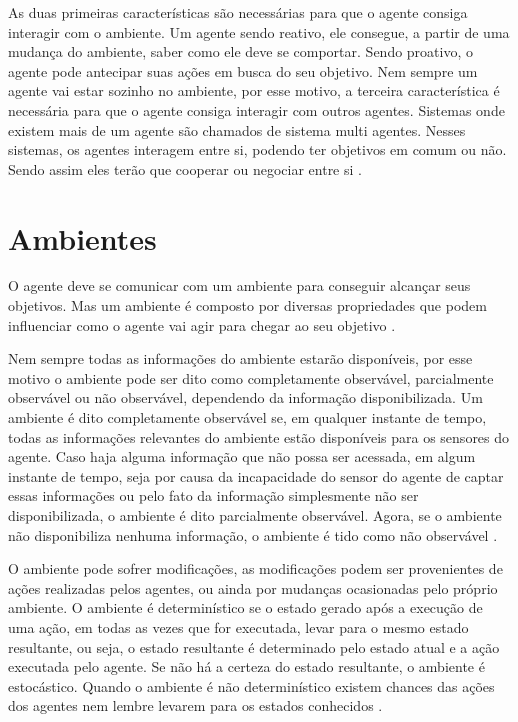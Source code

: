 As duas primeiras características são necessárias para que o agente consiga interagir com o ambiente. Um agente sendo reativo, ele consegue, a partir de uma mudança do ambiente, saber como ele deve se comportar. Sendo proativo, o agente pode antecipar suas ações em busca do seu objetivo.
Nem sempre um agente vai estar sozinho no ambiente, por esse motivo, a terceira característica é necessária para que o agente consiga interagir com outros agentes. Sistemas onde existem mais de um agente são chamados de sistema multi agentes. Nesses sistemas, os agentes interagem entre si, podendo ter objetivos em comum ou não. Sendo assim eles terão que cooperar ou negociar entre si \cite{intelligence2003modern}.

\section{Ambientes}

O agente deve se comunicar com um ambiente para conseguir alcançar seus objetivos. Mas um ambiente é composto por diversas propriedades que podem influenciar como o agente vai agir para chegar ao seu objetivo \cite{intelligence2003modern}. 

Nem sempre todas as informações do ambiente estarão disponíveis, por esse motivo o ambiente pode ser dito como completamente observável, parcialmente observável ou não observável, dependendo da informação disponibilizada. Um ambiente é dito completamente observável se, em qualquer instante de tempo, todas as informações relevantes do ambiente estão disponíveis para os sensores do agente. Caso haja alguma informação que não possa ser acessada, em algum instante de tempo, seja por causa da incapacidade do sensor do agente de captar essas informações ou pelo fato da informação simplesmente não ser disponibilizada, o ambiente é dito parcialmente observável. Agora, se o ambiente não disponibiliza nenhuma informação, o ambiente é tido como não observável \cite{ intelligence2003modern, agent1999}.   

O ambiente pode sofrer modificações, as modificações podem ser provenientes de ações realizadas pelos agentes, ou ainda por mudanças ocasionadas pelo próprio ambiente. O ambiente é determinístico se o estado gerado após a execução de uma ação, em todas as vezes que for executada, levar para o mesmo estado resultante, ou seja, o estado resultante é determinado pelo estado atual e a ação executada pelo agente. Se não há a certeza do estado resultante, o ambiente é estocástico. Quando o ambiente é não determinístico existem chances das ações dos agentes nem lembre levarem para os estados conhecidos \cite{intelligence2003modern}. 

